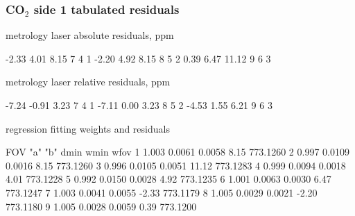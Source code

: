 \documentclass[9pt]{beamer}
\begin{document}
\begin{frame}[fragile]
\frametitle{CO$_2$ side 1 tabulated residuals}

  metrology laser absolute residuals, ppm
\begin{semiverbatim}\scriptsize
     -2.33     4.01     8.15         7   4   1
     -2.20     4.92     8.15         8   5   2
      0.39     6.47    11.12         9   6   3
\end{semiverbatim}

  metrology laser relative residuals, ppm
\begin{semiverbatim}\scriptsize
     -7.24    -0.91     3.23         7   4   1
     -7.11     0.00     3.23         8   5   2
     -4.53     1.55     6.21         9   6   3
\end{semiverbatim}

     regression fitting weights and residuals
\begin{semiverbatim}\scriptsize
 FOV   "a"       "b"     dmin     wmin      wfov
  1   1.003    0.0061   0.0058     8.15   773.1260 
  2   0.997    0.0109   0.0016     8.15   773.1260 
  3   0.996    0.0105   0.0051    11.12   773.1283 
  4   0.999    0.0094   0.0018     4.01   773.1228 
  5   0.992    0.0150   0.0028     4.92   773.1235 
  6   1.001    0.0063   0.0030     6.47   773.1247 
  7   1.003    0.0041   0.0055    -2.33   773.1179 
  8   1.005    0.0029   0.0021    -2.20   773.1180 
  9   1.005    0.0028   0.0059     0.39   773.1200 
\end{semiverbatim}

\end{frame}
\end{document}
